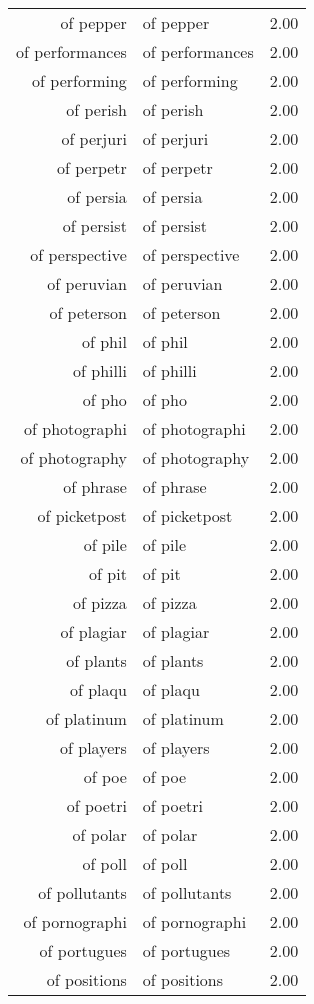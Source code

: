 \begin{table}[ht]
\begin{tabular}{rlr}
  of pepper & of pepper & 2.00 \\ 
  of performances & of performances & 2.00 \\ 
  of performing & of performing & 2.00 \\ 
  of perish & of perish & 2.00 \\ 
  of perjuri & of perjuri & 2.00 \\ 
  of perpetr & of perpetr & 2.00 \\ 
  of persia & of persia & 2.00 \\ 
  of persist & of persist & 2.00 \\ 
  of perspective & of perspective & 2.00 \\ 
  of peruvian & of peruvian & 2.00 \\ 
  of peterson & of peterson & 2.00 \\ 
  of phil & of phil & 2.00 \\ 
  of philli & of philli & 2.00 \\ 
  of pho & of pho & 2.00 \\ 
  of photographi & of photographi & 2.00 \\ 
  of photography & of photography & 2.00 \\ 
  of phrase & of phrase & 2.00 \\ 
  of picketpost & of picketpost & 2.00 \\ 
  of pile & of pile & 2.00 \\ 
  of pit & of pit & 2.00 \\ 
  of pizza & of pizza & 2.00 \\ 
  of plagiar & of plagiar & 2.00 \\ 
  of plants & of plants & 2.00 \\ 
  of plaqu & of plaqu & 2.00 \\ 
  of platinum & of platinum & 2.00 \\ 
  of players & of players & 2.00 \\ 
  of poe & of poe & 2.00 \\ 
  of poetri & of poetri & 2.00 \\ 
  of polar & of polar & 2.00 \\ 
  of poll & of poll & 2.00 \\ 
  of pollutants & of pollutants & 2.00 \\ 
  of pornographi & of pornographi & 2.00 \\ 
  of portugues & of portugues & 2.00 \\ 
  of positions & of positions & 2.00 \\ 

\end{tabular}
\end{table}
